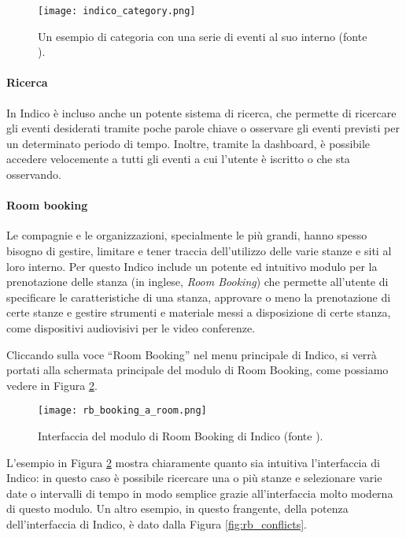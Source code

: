 		\begin{figure}[h!]
			\begin{center}
				\texttt{[image: indico\_category.png]}
			\end{center}
			\caption[Categoria in Indico (esempio)]{Un esempio di categoria con una serie di eventi al suo interno (fonte \cite{indico:user_guide_1.9.6}).}
			\label{fig:indico_category}
		\end{figure}
		
		\paragraph{Ricerca}In Indico è incluso anche un potente sistema di ricerca, che permette di ricercare gli eventi desiderati tramite poche parole chiave o osservare gli eventi previsti per un determinato periodo di tempo. Inoltre, tramite la dashboard, è possibile accedere velocemente a tutti gli eventi a cui l'utente è iscritto o che sta osservando.
		
		\paragraph{Room booking}Le compagnie e le organizzazioni, specialmente le più grandi, hanno spesso bisogno di gestire, limitare e tener traccia dell'utilizzo delle varie stanze e siti al loro interno. Per questo Indico include un potente ed intuitivo modulo per la prenotazione delle stanza (in inglese, \textit{Room Booking}) che permette all'utente di specificare le caratteristiche di una stanza, approvare o meno la prenotazione di certe stanze e gestire strumenti e materiale messi a disposizione di certe stanza, come dispositivi audiovisivi per le video conferenze.
		
		Cliccando sulla voce ``Room Booking'' nel menu principale di Indico, si verrà portati alla schermata principale del modulo di Room Booking, come possiamo vedere in Figura \ref{fig:rb_booking_a_room}.
		
		\begin{figure}[h!]
			\begin{center}
				\texttt{[image: rb\_booking\_a\_room.png]}
			\end{center}
			\caption[Room Booking in Indico]{Interfaccia del modulo di Room Booking di Indico (fonte \cite{indico:user_guide_1.9.6}).}
			\label{fig:rb_booking_a_room}
		\end{figure}
		
		L'esempio in Figura \ref{fig:rb_booking_a_room} mostra chiaramente quanto sia intuitiva l'interfaccia di Indico: in questo caso è possibile ricercare una o più stanze e selezionare varie date o intervalli di tempo in modo semplice grazie all'interfaccia molto moderna di questo modulo. Un altro esempio, in questo frangente, della potenza dell'interfaccia di Indico, è dato dalla Figura \ref{fig:rb_conflicts}.
		
